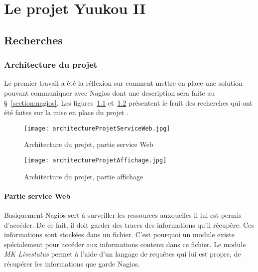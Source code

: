 \chapter{Le projet Yuukou II}

\section{Recherches}

\subsection{Architecture du projet}
\label{section:architectureProjet}

Le premier travail a \'et\'e la r\'eflexion sur comment mettre en place une solution pouvant communiquer avec Nagios dont une description sera faite au \S~\ref{section:nagios}.
Les figures~\ref{figure:architectureProjetServiceWeb} et~\ref{figure:architectureProjetAffichage} pr\'esentent le fruit des recherches qui ont \'et\'e faites sur la mise en place du projet \YuukouII.

\begin{figure}[!ht]
	\centering
	\texttt{[image: architectureProjetServiceWeb.jpg]}
	\caption{Architecture du projet, partie service Web}
	\label{figure:architectureProjetServiceWeb}

\end{figure}

\begin{figure}[!ht]
	\centering
	\texttt{[image: architectureProjetAffichage.jpg]}
	\caption{Architecture du projet, partie affichage}
	\label{figure:architectureProjetAffichage}

\end{figure}

\subsubsection{Partie service Web}

Basiquement Nagios sert \`a surveiller les ressources auxquelles il lui est permis d'acc\'eder.
De ce fait, il doit garder des traces des informations qu'il r\'ecup\`ere.
Ces informations sont stock\'ees dans un fichier.
C'est pourquoi un module existe sp\'ecialement pour acc\'eder aux informations contenu dans ce fichier. 
Le module \textit{MK Livestatus} permet \`a l'aide d'un langage de requ\^etes qui lui est propre, de r\'ecup\'erer les informations que garde Nagios.

